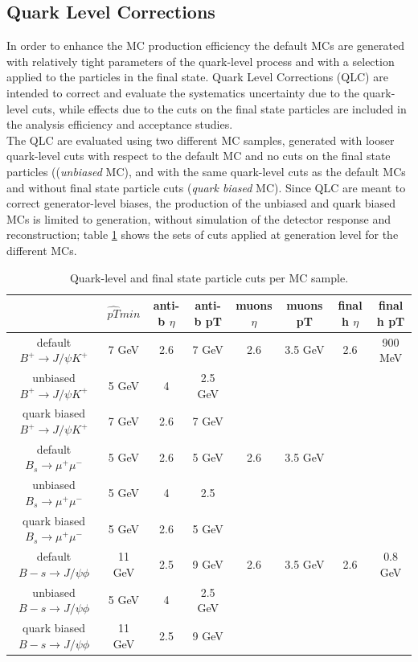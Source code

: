 \subsection{Quark Level Corrections}
\label{subsec:QLC}
In order to enhance the MC production efficiency the default 
MCs are generated with relatively tight parameters of the quark-level 
process and with a selection applied to the particles in the final 
state. Quark Level Corrections (QLC) are intended to correct 
and evaluate the systematics uncertainty due to the quark-level cuts, 
while effects due to the cuts on the final state 
particles are included in the analysis efficiency and acceptance studies.\\
The QLC are evaluated using two different MC samples, %
generated with looser quark-level cuts with respect to the default MC 
and no cuts on the final state particles ((\textit{unbiased} MC), and 
with the same quark-level cuts as the default MCs and without 
final state particle cuts (\textit{quark biased} MC).
Since QLC are meant to correct generator-level biases, 
the production of the unbiased and quark biased MCs is limited to 
generation, without simulation of the detector response and reconstruction; 
table \ref{table:genCuts} shows the sets of cuts applied at generation level for the different MCs.\\
\begin{table}[h]
  \begin{center} 
    \begin{tabular}{| c | c | c | c | c | c | c | c |}
      \hline
      & $\hat{pT}min$ &  anti-b $\eta$  &  anti-b pT  &  muons  $\eta$  &   muons pT  & final h  $\eta$  &  final h pT \\ \hline
      default $B^+ \to J/\psi K^+$  & 7 GeV &  2.6  &  7 GeV  &  2.6  &   3.5 GeV  & 2.6  & 900 MeV \\ \hline
      unbiased $B^+ \to J/\psi K^+$  & 5 GeV &  4  &  2.5 GeV  &   &    &  &  \\ \hline
      quark biased $B^+ \to J/\psi K^+$  & 7 GeV &  2.6  &  7 GeV  &    &    &  & \\ \hline
      default $B_s \to \mu^+ \mu^-$  & 5 GeV  &  2.6  & 5 GeV  &  2.6  &  3.5 GeV   &  &  \\ \hline
      unbiased $B_s \to \mu^+ \mu^-$  & 5 GeV  &  4  & 2.5  &    &     &  &  \\ \hline
      quark biased $B_s \to \mu^+ \mu^-$  &  5 GeV & 2.6   &  5 GeV &    &     &  &  \\ \hline
      default $B-s \to J/\psi \phi$  & 11 GeV  &  2.5  & 9 GeV  &  2.6  &  3.5 GeV   &  2.6 &  0.8 GeV \\ \hline
      unbiased $B-s \to J/\psi \phi$  & 5 GeV  & 4   & 2.5 GeV  &    &     &  &  \\ \hline
      quark biased $B-s \to J/\psi \phi$  &  11 GeV &  2.5  & 9 GeV  &    &     &  &  \\ \hline
    \end{tabular}
    \caption{Quark-level and final state particle cuts per MC sample.}
    \label{table:genCuts}  
  \end{center}
\end{table}

